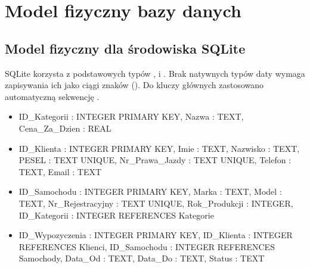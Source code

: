 \documentclass[a4paper,11pt,english,openany,oneside]{sphinxmanual}
\begin{document}
\section{Model fizyczny bazy danych}
\label{\detokenize{rozdzial_3/index:model-fizyczny-bazy-danych}}

\subsection{Model fizyczny dla środowiska SQLite}
\label{\detokenize{rozdzial_3/index:model-fizyczny-dla-srodowiska-sqlite}}
\sphinxAtStartPar
SQLite korzysta z podstawowych typów ,  i . Brak natywnych typów daty wymaga zapisywania ich jako ciągi znaków (). Do kluczy głównych zastosowano automatyczną sekwencję .
\begin{itemize}
\item {} 
\sphinxAtStartPar
{} ID\_Kategorii : INTEGER PRIMARY KEY, Nazwa : TEXT, Cena\_Za\_Dzien : REAL

\item {} 
\sphinxAtStartPar
{} ID\_Klienta : INTEGER PRIMARY KEY, Imie : TEXT, Nazwisko : TEXT, PESEL : TEXT UNIQUE, Nr\_Prawa\_Jazdy : TEXT UNIQUE, Telefon : TEXT, Email : TEXT

\item {} 
\sphinxAtStartPar
{} ID\_Samochodu : INTEGER PRIMARY KEY, Marka : TEXT, Model : TEXT, Nr\_Rejestracyjny : TEXT UNIQUE, Rok\_Produkcji : INTEGER, ID\_Kategorii : INTEGER REFERENCES Kategorie

\item {} 
\sphinxAtStartPar
{} ID\_Wypozyczenia : INTEGER PRIMARY KEY, ID\_Klienta : INTEGER REFERENCES Klienci, ID\_Samochodu : INTEGER REFERENCES Samochody, Data\_Od : TEXT, Data\_Do : TEXT, Status : TEXT

\end{itemize}
\end{document}
